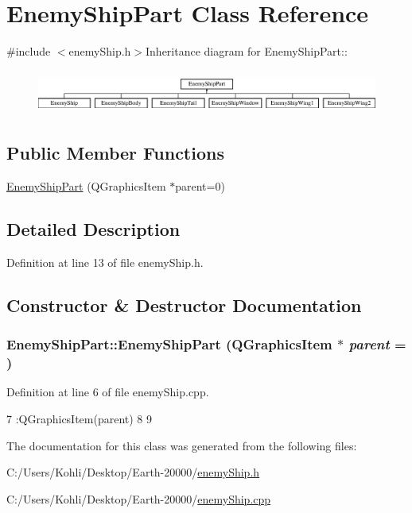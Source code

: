 \hypertarget{class_enemy_ship_part}{
\section{EnemyShipPart Class Reference}
\label{class_enemy_ship_part}
}


{\ttfamily \#include $<$enemyShip.h$>$}Inheritance diagram for EnemyShipPart::\begin{figure}[H]
\begin{center}
\leavevmode
\includegraphics[height=1.46982cm]{class_enemy_ship_part}
\end{center}
\end{figure}
\subsection*{Public Member Functions}
\begin{DoxyCompactItemize}
\item 
\hyperlink{class_enemy_ship_part_a82f508e72f029dbd9e5bf596c507beec}{EnemyShipPart} (QGraphicsItem $\ast$parent=0)
\end{DoxyCompactItemize}


\subsection{Detailed Description}


Definition at line 13 of file enemyShip.h.

\subsection{Constructor \& Destructor Documentation}
\hypertarget{class_enemy_ship_part_a82f508e72f029dbd9e5bf596c507beec}{
\subsubsection[{EnemyShipPart}]{\setlength{\rightskip}{0pt plus 5cm}EnemyShipPart::EnemyShipPart (QGraphicsItem $\ast$ {\em parent} = {})}}
\label{class_enemy_ship_part_a82f508e72f029dbd9e5bf596c507beec}


Definition at line 6 of file enemyShip.cpp.


\begin{DoxyCode}
7         :QGraphicsItem(parent)
8 {
9 }
\end{DoxyCode}


The documentation for this class was generated from the following files:\begin{DoxyCompactItemize}
\item 
C:/Users/Kohli/Desktop/Earth-\/20000/\hyperlink{enemy_ship_8h}{enemyShip.h}\item 
C:/Users/Kohli/Desktop/Earth-\/20000/\hyperlink{enemy_ship_8cpp}{enemyShip.cpp}\end{DoxyCompactItemize}
